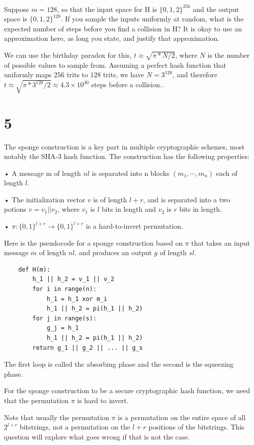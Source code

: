 \documentclass[11pt]{article}
\begin{document}
Suppose $m = 128$, so that the input space for H is $\{0, 1, 2\}^256$ and the output space is $\{0, 1, 2\}^128$. If you sample the inputs uniformly at random, what is the expected number of steps before you ﬁnd a collision in H? It is okay to use an approximation here, as long you state, and justify that approximation.

We can use the birthday paradox for this, $t \approx \sqrt{\pi * N / 2}$, where $N$ is the number of possible values to sample from. Assuming a perfect hash function that uniformly maps $256$ trits to $128$ trits, we have $N = 3^{128}$, and therefore $t \approx \sqrt{\pi * 3^{128} / 2} \approx 4.3 \times10^{30}$ steps before a collision..

\newpage

\section{5}

The sponge construction is a key part in multiple cryptographic schemes, most notably the SHA-3 hash function. The construction has the following properties:

• A message m of length $nl$ is separated into n blocks $(m_1,\cdots,m_n)$ each of length $l$.

• The initialization vector $v$ is of length $l + r$, and is separated into a two potions $v = v_1 || v_2$, where $v_1$ is $l$ bits in length and $v_2$ is $r$ bits in length.

• $\pi : \{0,1\}^{l+r} \rightarrow \{0,1\}^{l+r}$ is a hard-to-invert permutation.

Here is the pseudocode for a sponge construction based on $\pi$ that takes an input message $m$ of length $nl$, and produces an output $g$ of length $sl$.

\begin{verbatim}
    def H(m):
        h_1 || h_2 = v_1 || v_2
        for i in range(n):
            h_1 = h_1 xor m_i
            h_1 || h_2 = pi(h_1 || h_2)
        for j in range(s):
            g_j = h_1
            h_1 || h_2 = pi(h_1 || h_2)
        return g_1 || g_2 || ... || g_s
\end{verbatim}

The first loop is called the absorbing phase and the second is the squeezing phase.

For the sponge construction to be a secure cryptographic hash function, we need that the permutation $\pi$ is hard to invert.

Note that usually the permutation $\pi$ is a permutation on the entire space of all $2^{l + r}$ bitstrings, not a permutation on the $l + r$ positions of the bitstrings. This question will explore what goes wrong
if that is not the case. 
\end{document}
